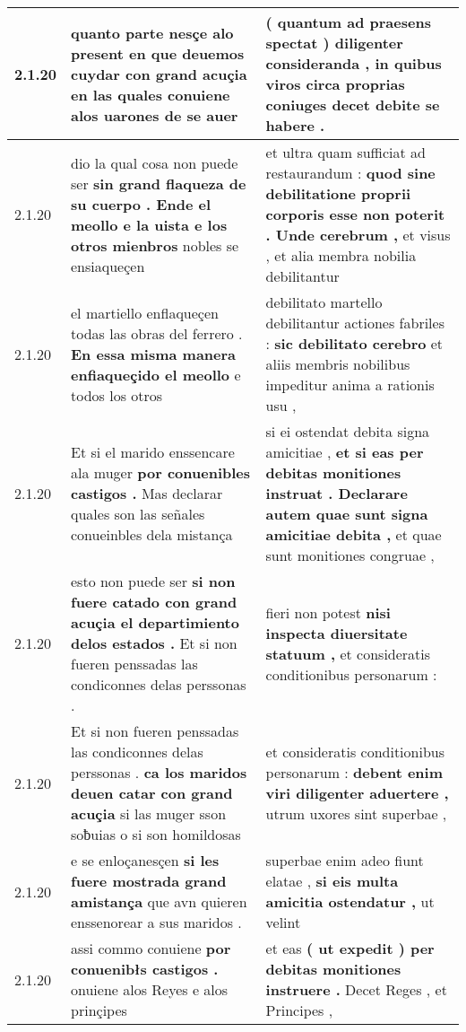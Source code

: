 \begin{tabular}{|p{1cm}|p{6.5cm}|p{6.5cm}|}
2.1.20 & quanto parte nesçe alo present \textbf{ en que deuemos cuydar con grand acuçia } en las quales conuiene alos uarones de se auer & ( quantum ad praesens spectat ) \textbf{ diligenter consideranda , } in quibus viros circa proprias coniuges decet debite se habere . \\\hline
2.1.20 & dio la qual cosa non puede ser \textbf{ sin grand flaqueza de su cuerpo . Ende el meollo e la uista e los otros mienbros } nobles se ensiaqueçen & et ultra quam sufficiat ad restaurandum : \textbf{ quod sine debilitatione proprii corporis esse non poterit . Unde cerebrum , } et visus , et alia membra nobilia debilitantur \\\hline
2.1.20 & el martiello enflaqueçen todas las obras del ferrero . \textbf{ En essa misma manera enfiaqueçido el meollo } e todos los otros & debilitato martello debilitantur actiones fabriles : \textbf{ sic debilitato cerebro } et aliis membris nobilibus impeditur anima a rationis usu , \\\hline
2.1.20 & Et si el marido enssencare ala muger \textbf{ por conuenibles castigos . } Mas declarar quales son las señales conueinbles dela mistança & si ei ostendat debita signa amicitiae , \textbf{ et si eas per debitas monitiones instruat . Declarare autem quae sunt signa amicitiae debita , } et quae sunt monitiones congruae , \\\hline
2.1.20 & esto non puede ser \textbf{ si non fuere catado con grand acuçia el departimiento delos estados . } Et si non fueren penssadas las condiconnes delas perssonas . & fieri non potest \textbf{ nisi inspecta diuersitate statuum , } et consideratis conditionibus personarum : \\\hline
2.1.20 & Et si non fueren penssadas las condiconnes delas perssonas . \textbf{ ca los maridos deuen catar con grand acuçia } si las muger sson soƀuias o si son homildosas & et consideratis conditionibus personarum : \textbf{ debent enim viri diligenter aduertere , } utrum uxores sint superbae , \\\hline
2.1.20 & e se enloçanesçen \textbf{ si les fuere mostrada grand amistança } que avn quieren enssenorear a sus maridos . & superbae enim adeo fiunt elatae , \textbf{ si eis multa amicitia ostendatur , } ut velint \\\hline
2.1.20 & assi commo conuiene \textbf{ por conuenibłs castigos . } onuiene alos Reyes e alos prinçipes & et eas \textbf{ ( ut expedit ) per debitas monitiones instruere . } Decet Reges , et Principes , \\\hline

\end{tabular}
